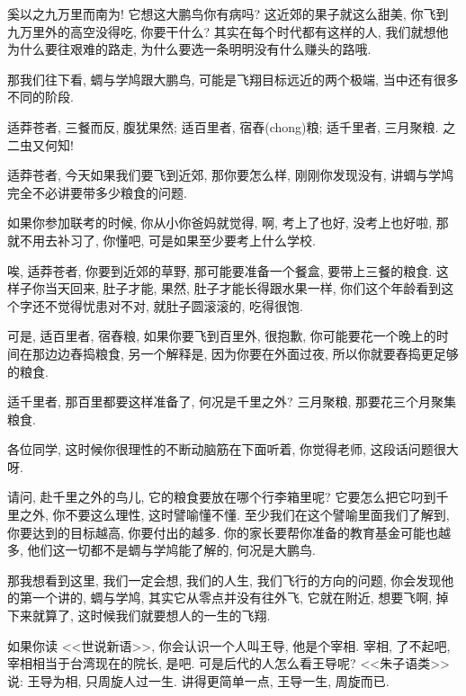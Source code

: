 \documentclass[11pt]{article}
\begin{document}
{\color{blue}奚以之九万里而南为!} 它想这大鹏鸟你有病吗? 这近郊的果子就这么甜美, 你飞到九万里外的高空没得吃, 你要干什么? 其实在每个时代都有这样的人, 我们就想他为什么要往艰难的路走, 为什么要选一条明明没有什么赚头的路哦.

那我们往下看, 蜩与学鸠跟大鹏鸟, 可能是飞翔目标远近的两个极端, 当中还有很多不同的阶段.

\begin{center}
	{\color{magenta} 适莽苍者, 三餐而反, 腹犹果然; 适百里者, 宿舂(chong)粮; 适千里者, 三月聚粮. 之二虫又何知!}
\end{center}

\vspace{-0.5cm}

{\color{blue} 适莽苍者}, 今天如果我们要飞到近郊, 那你要怎么样, 刚刚你发现没有, 讲蜩与学鸠完全不必讲要带多少粮食的问题.

如果你参加联考的时候, 你从小你爸妈就觉得, 啊, 考上了也好, 没考上也好啦, 那就不用去补习了, 你懂吧, 可是如果至少要考上什么学校.

唉, {\color{blue}适莽苍者}, 你要到近郊的草野, 那可能要准备一个餐盒, 要带上三餐的粮食. 这样子你当天回来, 肚子才能, 果然, 肚子才能长得跟水果一样, 你们这个年龄看到这个字还不觉得忧患对不对, 就肚子圆滚滚的, 吃得很饱. 

可是, {\color{blue} 适百里者, 宿舂粮}, 如果你要飞到百里外, 很抱歉, 你可能要花一个晚上的时间在那边边舂捣粮食, 另一个解释是, 因为你要在外面过夜, 所以你就要舂捣更足够的粮食.

{\color{blue} 适千里者}, 那百里都要这样准备了, 何况是千里之外? {\color{blue} 三月聚粮}, 那要花三个月聚集粮食. 

各位同学, 这时候你很理性的不断动脑筋在下面听着, 你觉得老师, 这段话问题很大呀.

请问, 赴千里之外的鸟儿, 它的粮食要放在哪个行李箱里呢? 它要怎么把它叼到千里之外, 你不要这么理性, 这时譬喻懂不懂. 至少我们在这个譬喻里面我们了解到, 你要达到的目标越高, 你要付出的越多. 你的家长要帮你准备的教育基金可能也越多, 他们这一切都不是蜩与学鸠能了解的, 何况是大鹏鸟.

那我想看到这里, 我们一定会想, 我们的人生, 我们飞行的方向的问题, 你会发现他的第一个讲的, 蜩与学鸠, 其实它从零点并没有往外飞, 它就在附近, 想要飞啊, 掉下来就算了, 这时候我们就要想人的一生的飞翔. 

如果你读 <<世说新语>>, 你会认识一个人叫王导, 他是个宰相. 宰相, 了不起吧, 宰相相当于台湾现在的院长, 是吧. 可是后代的人怎么看王导呢?  <<朱子语类>> 说: 王导为相, 只周旋人过一生. 讲得更简单一点, 王导一生, 周旋而已.
\end{document}
